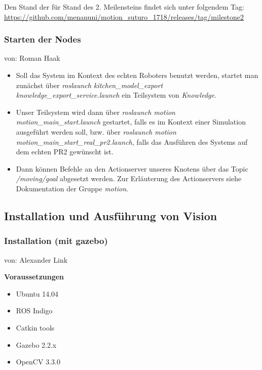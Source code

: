 \documentclass{suturo}
\makeatletter
\newcommand{\chapterauthor}[1]{%
  {\parindent0pt\vspace*{-27pt}%
  \linespread{0}\small\begin{flushright}von: #1\end{flushright}%
  \par\nobreak\vspace*{0pt}}
  \@afterheading%
}
\makeatother
\begin{document}
Den Stand der für Stand  des 2. Meilensteins findet sich unter folgendem Tag: \\
\url{https://github.com/menanuni/motion_suturo_1718/releases/tag/milestone2} \\

\subsubsection{Starten der Nodes}
\chapterauthor{Roman Haak}
\begin{itemize}

\item Soll das System im Kontext des echten Roboters benutzt werden, startet man zunächst über \textit{roslaunch kitchen\_model\_export knowledge\_export\_service.launch} ein Teilsystem von \textit{Knowledge}.

\item Unser Teilsystem wird dann über \textit{roslaunch motion motion\_main\_start.launch} gestartet, falls es im Kontext einer Simulation ausgeführt werden soll, bzw. über \textit{roslaunch motion motion\_main\_start\_real\_pr2.launch}, falls das Ausführen des Systems auf dem echten PR2 gewünscht ist.

\item Dann können Befehle an den Actionserver unseres Knotens über das Topic \textit{/moving/goal} abgesetzt werden. Zur Erläuterung des Actionservers siehe Dokumentation der Gruppe \textit{motion}.
\end{itemize}

\subsection{Installation und Ausführung von Vision}

\subsubsection{Installation (mit gazebo)}
\chapterauthor{Alexander Link}

\textbf{Voraussetzungen}

\begin{itemize}
\item Ubuntu 14.04
\item ROS Indigo
\item Catkin tools
\item Gazebo 2.2.x
\item OpenCV 3.3.0
\end{itemize}
\end{document}

